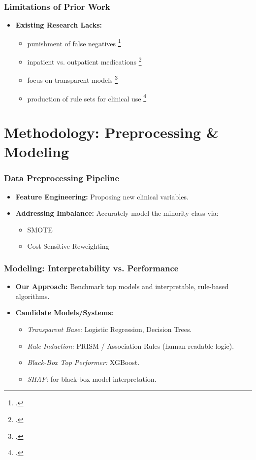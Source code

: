\documentclass{beamer}
\begin{document}
\begin{frame}\frametitle{Limitations of Prior Work}
\begin{itemize}
    \item \textbf{Existing Research Lacks:}
    \begin{itemize}
        \item punishment of false negatives \footcite{rubin_correction_2018}
        \item inpatient vs. outpatient medications \footcite{rubin_correction_2018}
        \item focus on transparent models \footcite{liu_comparison_2024}
        \item production of rule sets for clinical use \footcite{liu_comparison_2024}
    \end{itemize}
\end{itemize}
\end{frame}

\section{Methodology: Preprocessing \& Modeling}

\begin{frame}\frametitle{Data Preprocessing Pipeline}
\begin{itemize}
    \item \textbf{Feature Engineering:} Proposing new clinical variables.
    \vspace{6pt}
    \item \textbf{Addressing Imbalance:} Accurately model the minority class via:
    \begin{itemize}
      \item SMOTE
      \item Cost-Sensitive Reweighting
    \end{itemize}
\end{itemize}
\end{frame}

\begin{frame}\frametitle{Modeling: Interpretability vs. Performance}
\begin{itemize}
    \item \textbf{Our Approach:} Benchmark top models and interpretable, rule-based algorithms.
    \vspace{6pt}
    \item \textbf{Candidate Models/Systems:}
    \begin{itemize}
        \item \textit{Transparent Base:} Logistic Regression, Decision Trees.
        \item \textit{Rule-Induction:} PRISM / Association Rules (human-readable logic).
        \item \textit{Black-Box Top Performer:} XGBoost.
        \item \textit{SHAP:} for black-box model interpretation.
    \end{itemize}
\end{itemize}
\end{frame}
\end{document}
